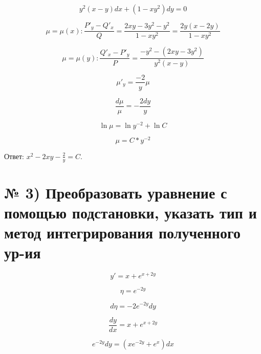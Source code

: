 \documentclass[a4paper]{article}
\begin{document}
\begin{equation*}
y^2(x - y)dx + (1 - xy^2)dy = 0
\end{equation*}

\begin{equation*}
\mu = \mu(x): \frac{P'_y - Q'_x}{Q} = \frac{2xy - 3y^2 - y^2}{1 - xy^2} = \frac{2y(x - 2y)}{1 - xy^2}
\end{equation*}

\begin{equation*}
\mu = \mu(y): \frac{Q'_x - P'_y}{P} = \frac{-y^2 - (2xy - 3y^2)}{y^2(x - y)}
\end{equation*}

\begin{equation*}
\mu'_y = \frac{-2}{y}\mu
\end{equation*}

\begin{equation*}
\frac{d\mu}{\mu} = - \frac{2dy}{y}
\end{equation*}

\begin{equation*}
\ln{\mu} = \ln{y^{-2}} + \ln{C}
\end{equation*}

\begin{equation*}
\mu = C*y^{-2}
\end{equation*}

Ответ: $ x^2 - 2xy - \frac{2}{y} = C.$

\section*{№ 3) Преобразовать уравнение с помощью подстановки, указать тип и метод интегрирования полученного ур-ия}

\begin{equation*}
y' = x + e^{x + 2y}
\end{equation*}

\begin{equation*}
\eta = e^{-2y}
\end{equation*}

\begin{equation*}
d\eta = -2e^{-2y}dy
\end{equation*}

\begin{equation*}
\frac{dy}{dx} = x + e^{x + 2y}
\end{equation*}

\begin{equation*}
e^{-2y}dy = (xe^{-2y} + e^x)dx
\end{equation*}
\end{document}
